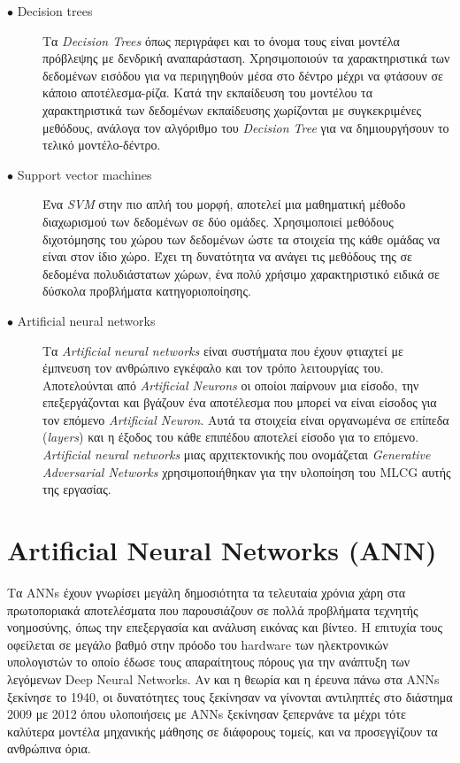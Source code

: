 \begin{description}

\item[$\bullet$ Decision trees] Τα \textit{Decision Trees} όπως περιγράφει και το όνομα τους είναι μοντέλα πρόβλεψης με δενδρική αναπαράσταση. Χρησιμοποιούν τα χαρακτηριστικά των δεδομένων εισόδου για να περιηγηθούν μέσα στο δέντρο μέχρι να φτάσουν σε κάποιο αποτέλεσμα-ρίζα. Κατά την εκπαίδευση του μοντέλου τα χαρακτηριστικά των δεδομένων εκπαίδευσης χωρίζονται με συγκεκριμένες μεθόδους, ανάλογα τον αλγόριθμο του \textit{Decision Tree} για να δημιουργήσουν το τελικό μοντέλο-δέντρο.

\item[$\bullet$ Support vector machines] Ένα \textit{SVM} στην πιο απλή του μορφή, αποτελεί μια μαθηματική μέθοδο διαχωρισμού των δεδομένων σε δύο ομάδες. Χρησιμοποιεί μεθόδους διχοτόμησης του χώρου των δεδομένων ώστε τα στοιχεία της κάθε ομάδας να είναι στον ίδιο χώρο. Έχει τη δυνατότητα να ανάγει τις μεθόδους της σε δεδομένα πολυδιάστατων χώρων, ένα πολύ χρήσιμο χαρακτηριστικό ειδικά σε δύσκολα προβλήματα κατηγοριοποίησης. 

\item[$\bullet$ Artificial neural networks] Τα \textit{Artificial neural networks} είναι συστήματα που έχουν φτιαχτεί με έμπνευση τον ανθρώπινο εγκέφαλο και τον τρόπο λειτουργίας του. Αποτελούνται από \textit{Artificial Neurons} οι οποίοι παίρνουν μια είσοδο, την επεξεργάζονται και βγάζουν ένα αποτέλεσμα που μπορεί να είναι είσοδος για τον επόμενο \textit{Artificial Neuron}. Αυτά τα στοιχεία είναι οργανωμένα σε επίπεδα (\textit{layers}) και η έξοδος του κάθε επιπέδου αποτελεί είσοδο για το επόμενο. \textit{Artificial neural networks} μιας αρχιτεκτονικής που ονομάζεται \textit{Generative Adversarial Networks} χρησιμοποιήθηκαν για την υλοποίηση του MLCG αυτής της εργασίας.

\end{description}



\section{Artificial Neural Networks (ANN)}
Τα ANNs έχουν γνωρίσει μεγάλη δημοσιότητα τα τελευταία χρόνια χάρη στα πρωτοποριακά αποτελέσματα που παρουσιάζουν σε πολλά προβλήματα τεχνητής νοημοσύνης, όπως την επεξεργασία και ανάλυση εικόνας και βίντεο. Η επιτυχία τους οφείλεται σε μεγάλο βαθμό στην πρόοδο του hardware των ηλεκτρονικών υπολογιστών το οποίο έδωσε τους απαραίτητους πόρους για την ανάπτυξη των λεγόμενων Deep Neural Networks. Αν και η θεωρία και η έρευνα πάνω στα ANNs ξεκίνησε το 1940, οι δυνατότητες τους ξεκίνησαν να γίνονται αντιληπτές στο διάστημα 2009 με 2012 όπου υλοποιήσεις με ANNs ξεκίνησαν ξεπερνάνε τα μέχρι τότε καλύτερα μοντέλα μηχανικής μάθησης σε διάφορους τομείς, και να προσεγγίζουν τα ανθρώπινα όρια.

